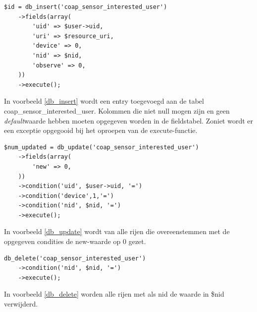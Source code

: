\newpage
\scriptsize
\lstset{language=PHP}
\begin{lstlisting}[label=db_insert,caption=Voorbeeld gebruik van db\_insert]
$id = db_insert('coap_sensor_interested_user')
	->fields(array(
		'uid' => $user->uid,
		'uri' => $resource_uri,
		'device' => 0,
		'nid' => $nid,
		'observe' => 0,
	))
	->execute();
\end{lstlisting}
\normalsize
In voorbeeld \ref{db_insert} wordt een entry toegevoegd aan de tabel coap\_sensor\_interested\_user. Kolommen die niet null mogen zijn en geen \textit{default}waarde hebben moeten opgegeven worden in de fieldstabel. Zoniet wordt er een exceptie opgegooid bij het oproepen van de execute-functie.

\scriptsize
\lstset{language=PHP}
\begin{lstlisting}[label=db_update,caption=Voorbeeld gebruik van db\_update]
$num_updated = db_update('coap_sensor_interested_user')
	->fields(array(
		'new' => 0,
	))
	->condition('uid', $user->uid, '=')
	->condition('device',1,'=')
	->condition('nid', $nid, '=')
	->execute();
\end{lstlisting}
\normalsize
In voorbeeld \ref{db_update} wordt van alle rijen die overeenstemmen met de opgegeven condities de new-waarde op 0 gezet. %

\scriptsize
\lstset{language=PHP}
\begin{lstlisting}[label=db_delete,caption=Voorbeeld gebruik van db\_delete]
db_delete('coap_sensor_interested_user')
	->condition('nid', $nid, '=')
	->execute();
\end{lstlisting}
\normalsize
In voorbeeld \ref{db_delete} worden alle rijen met als nid de waarde in \$nid verwijderd. %

\newpage
